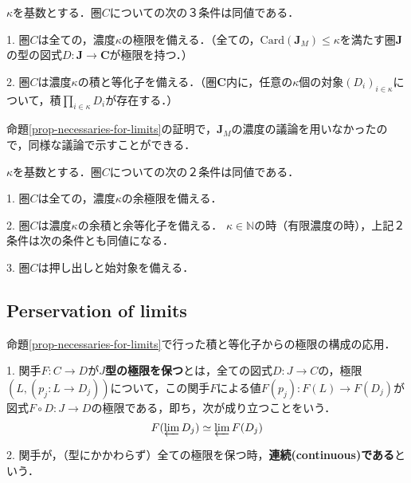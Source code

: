 \documentclass[uplatex, 12pt, dvipdfmx]{jsarticle}
\begin{document}
\begin{corollary}\label{corollary-necessarilies-for-limits}
    $\kappa$を基数とする．圏$C$についての次の３条件は同値である．

    1. 圏$C$は全ての，濃度$\kappa$の極限を備える．（全ての，$\mathrm{Card}(\mathbf{J}_M)\le\kappa$を満たす圏$\mathbf{J}$の型の図式$D:\mathbf{J}\to\mathbf{C}$が極限を持つ．）

    2. 圏$C$は濃度$\kappa$の積と等化子を備える．（圏$\mathbf{C}$内に，任意の$\kappa$個の対象$(D_i)_{i\in\kappa}$について，積$\prod_{i\in\kappa}D_i$が存在する．）
\end{corollary}
命題\ref{prop-necessaries-for-limits}の証明で，$\mathbf{J}_M$の濃度の議論を用いなかったので，同様な議論で示すことができる．

\begin{theorem}[余極限を持つための条件]
    $\kappa$を基数とする．圏$C$についての次の２条件は同値である．

    1. 圏$C$は全ての，濃度$\kappa$の余極限を備える．

    2. 圏$C$は濃度$\kappa$の余積と余等化子を備える．
    \noindent
    $\kappa\in\mathbb{N}$の時（有限濃度の時），上記２条件は次の条件とも同値になる．

    3. 圏$C$は押し出しと始対象を備える．
\end{theorem}

\subsection{Perservation of limits}
命題\ref{prop-necessaries-for-limits}で行った積と等化子からの極限の構成の応用．

\begin{definition}
    1. 関手$F:C\to D$が\textbf{$J$型の極限を保つ}とは，全ての図式$D:J\to C$の，極限$(L,(p_j:L\to D_j))$について，この関手$F$による値$F(p_j):F(L)\to F(D_j)$が図式$F\circ D:J\to D$の極限である，即ち，次が成り立つことをいう．
    \[ F(\varprojlim D_j)\simeq \varprojlim F(D_j) \]

    2. 関手が，（型にかかわらず）全ての極限を保つ時，\textbf{連続(continuous)である}という．
\end{definition}
\end{document}
